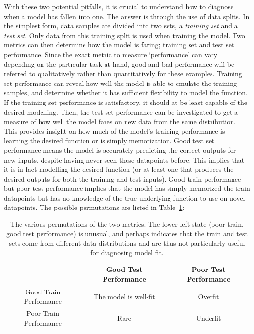 With these two potential pitfalls, it is crucial to understand how to diagnose when a model has fallen into one. The answer is through the
use of data splits. In the simplest form, data samples are divided into two sets, a \textit{training set} and
a \textit{test set}. Only data from this training split is used when training the model. Two metrics can then
determine how the model is faring; training set and test set performance. Since the exact metric to measure `performance'
can vary depending on the particular task at hand, good and bad performance will be referred to qualitatively
rather than quantitatively for these examples. Training set performance can reveal how well the model is able to
emulate the training samples, and determine whether it has sufficient flexibility to model the function. If the training set
performance is satisfactory, it should at be least capable of the desired modelling. Then,
the test set performance can be investigated to get a measure of how well the model fares on new data from the same distribution. This
provides insight on how much of the model's training performance is learning the desired function or is simply memorization.
Good test set performance means the model is accurately predicting the correct outputs for new inputs, despite having never
seen these datapoints before. This implies that it is in fact modelling the desired function (or at least one that produces
the desired outputs for both the training and test inputs). Good train performance but poor test performance implies that
the model has simply memorized the train datapoints but has no knowledge of the true underlying function to use on novel datapoints.
The possible permutations are listed in Table~\ref{tab:traintestfitting}:
\begin{table}[h]
	\begin{center}
	\begin{tabular}{c|cc}
		 						& Good Test Performance & Poor Test Performance	\\ \hline
		 Good Train Performance & The model is well-fit & Overfit 		\\
		 Poor Train Performance & 		Rare			& Underfit		\\
	\end{tabular}
	\end{center}
	\caption[Indicators of over and underfitting]{The various permutations of the two metrics. The lower left state (poor train, good test performance) is unusual,
		and perhaps indicates that the train and test sets come from different data distributions and are thus not
		particularly useful for diagnosing model fit.}
	\label{tab:traintestfitting}
\end{table}

